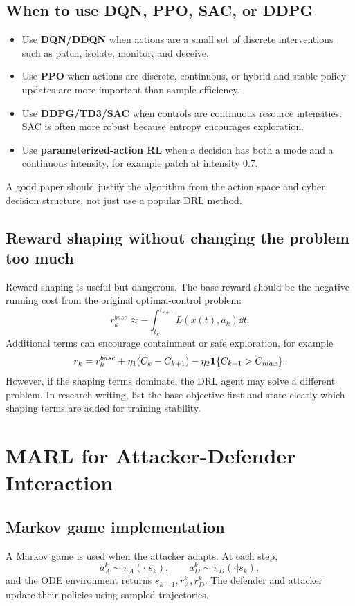 \documentclass[11pt,a4paper]{article}
\begin{document}
\subsection{When to use DQN, PPO, SAC, or DDPG}
\begin{itemize}
\item Use \textbf{DQN/DDQN} when actions are a small set of discrete interventions such as patch, isolate, monitor, and deceive.
\item Use \textbf{PPO} when actions are discrete, continuous, or hybrid and stable policy updates are more important than sample efficiency.
\item Use \textbf{DDPG/TD3/SAC} when controls are continuous resource intensities. SAC is often more robust because entropy encourages exploration.
\item Use \textbf{parameterized-action RL} when a decision has both a mode and a continuous intensity, for example patch at intensity 0.7.
\end{itemize}
A good paper should justify the algorithm from the action space and cyber decision structure, not just use a popular DRL method.

\subsection{Reward shaping without changing the problem too much}
Reward shaping is useful but dangerous. The base reward should be the negative running cost from the original optimal-control problem:
\begin{equation}
r_k^{base}\approx-\int_{t_k}^{t_{k+1}}L(x(t),a_k)\dd t.
\end{equation}
Additional terms can encourage containment or safe exploration, for example
\begin{equation}
r_k=r_k^{base}+\eta_1(C_k-C_{k+1})-\eta_2\mathbf{1}\{C_{k+1}>C_{max}\}.
\end{equation}
However, if the shaping terms dominate, the DRL agent may solve a different problem. In research writing, list the base objective first and state clearly which shaping terms are added for training stability.

\section{MARL for Attacker-Defender Interaction}
\subsection{Markov game implementation}
A Markov game is used when the attacker adapts. At each step,
\begin{equation}
a_A^k\sim\pi_A(\cdot|s_k),\qquad a_D^k\sim\pi_D(\cdot|s_k),
\end{equation}
and the ODE environment returns $s_{k+1},r_A^k,r_D^k$. The defender and attacker update their policies using sampled trajectories.
\end{document}
